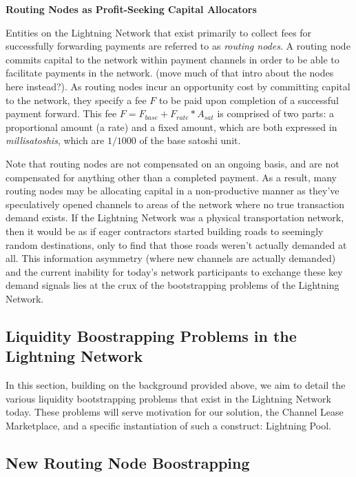 \documentclass[10pt,a4paper]{article}
\theoremstyle{definition}
\begin{document}
\begin{center}
\textbf{Routing Nodes as Profit-Seeking Capital Allocators}
\end{center}

Entities on the Lightning Network that exist primarily to collect fees for
successfully forwarding payments are referred to as \emph{routing nodes}. A
routing node commits capital to the network within payment channels in order to
be able to facilitate payments in the network. (move much of that intro about
the nodes here instead?). As routing nodes incur an opportunity cost by
committing capital to the network, they specify a fee $F$ to be paid upon
completion of a successful payment forward. This fee $F = F_{base} +
F_{rate}*A_{sat}$ is comprised of two parts: a proportional amount (a rate) and
a fixed amount, which are both expressed in \emph{millisatoshis}, which are
$1/1000$ of the base satoshi unit.

 Note that routing nodes are not compensated on an ongoing basis, and are not
 compensated for anything other than a completed payment. As a result, many
 routing nodes may be allocating capital in a non-productive manner
 \cite{avivCharge} as they've speculatively opened channels to areas of the
 network where no true transaction demand exists. If the Lightning Network was
 a physical transportation network, then it would be as if eager contractors
 started building roads to seemingly random destinations, only to find that
 those roads weren't actually demanded at all. This information asymmetry
 (where new channels are actually demanded) and the current inability for
 today's network participants to exchange these key demand signals lies at the
 crux of the bootstrapping problems of the Lightning Network.

\subsection{Liquidity Boostrapping Problems in the Lightning Network}

In this section, building on the background provided above, we aim to detail
the various liquidity bootstrapping problems that exist in the Lightning
Network today.  These problems will serve motivation for our solution, the
Channel Lease Marketplace, and a specific instantiation of such a construct:
Lightning Pool.


\subsection{New Routing Node Boostrapping}
\end{document}
